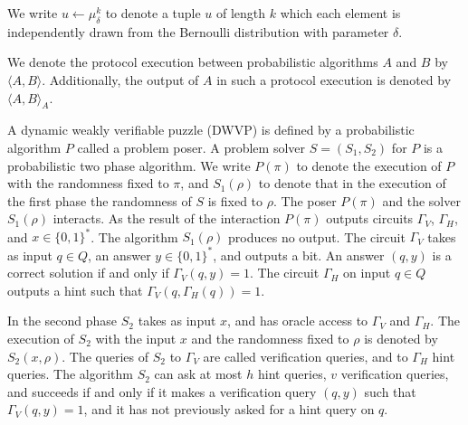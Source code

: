 %
%
\noindent
We write $u \leftarrow \mu_{\delta}^k$ to denote a tuple $u$ of length $k$ which each element
is independently drawn from the Bernoulli distribution with parameter $\delta$.

We denote the protocol execution between probabilistic algorithms $A$ and $B$ by $\langle A, B \rangle$.
Additionally, the output of $A$ in such a protocol execution is denoted by $\langle A, B \rangle_A$.
%
\begin{definition}
  \label{def:dwvp}
  A dynamic weakly verifiable puzzle (DWVP) is defined by a probabilistic algorithm $P$
  called a problem poser.
  A problem solver $S = (S_1, S_2)$ for $P$ is a probabilistic two phase algorithm.
  We write $P(\pi)$ to denote the execution of $P$ with the randomness fixed to $\pi$, and $S_1(\rho)$
  to denote that in the execution of the first phase the randomness of $S$ is fixed to $\rho$.
  The poser $P(\pi)$ and the solver $S_1(\rho)$ interacts.
  As the result of the interaction $P(\pi)$ outputs circuits $\Gamma_{V}$, $\Gamma_{H}$, and $x \in \{0,1\}^{*}$.
  The algorithm $S_1(\rho)$ produces no output.
  The circuit $\Gamma_{V}$ takes as input $q \in Q$, an answer $y \in \{0,1\}^*$,
  and outputs a bit. An answer $(q,y)$ is a correct solution if and only if $\Gamma_V(q,y) = 1$.
  The circuit $\Gamma_H$ on input $q \in Q$ outputs a hint such that $\Gamma_V(q,\Gamma_H(q)) = 1$.

  In the second phase $S_2$ takes as input $x$, and has oracle access to $\Gamma_V$ and $\Gamma_H$.
  The execution of $S_2$ with the input $x$ and the randomness fixed to $\rho$
  is denoted by $S_2(x, \rho)$. The queries of $S_2$ to $\Gamma_V$ are called verification queries, and to $\Gamma_H$ hint queries.
  The algorithm $S_2$ can ask at most $h$ hint queries, $v$ verification queries, and succeeds if and only if
  it makes a verification query $(q,y)$ such that $\Gamma_V(q,y) = 1$, and it has not previously asked for a hint query on $q$.
\end{definition}
%
